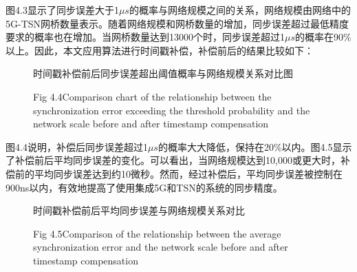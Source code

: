 \documentclass[UTF8,a4paper,12pt]{ctexart}
\numberwithin{equation}{section}
\begin{document}
	图4.3显示了同步误差大于1$\mu s$的概率与网络规模之间的关系，网络规模由网络中的5G-TSN网桥数量表示。随着网络规模和网桥数量的增加，同步误差超过最低精度要求的概率也在增加。当网桥数量达到13000个时，同步误差超过1$\mu s$的概率在90\%以上。因此，本文应用算法进行时间戳补偿，补偿前后的结果比较如下：
	\begin{figure}[htb] 
		\caption{时间戳补偿前后同步误差超出阈值概率与网络规模关系对比图}
		\vspace{-10pt}
		\caption*{Fig 4.4\quad Comparison chart of the relationship between the synchronization error exceeding the threshold probability and the network scale before and after timestamp compensation} 
	\end{figure}
	
	图4.4说明，补偿后同步误差超过1$\mu s$的概率大大降低，保持在20\%以内。图4.5显示了补偿前后平均同步误差的变化。可以看出，当网络规模达到10,000或更大时，补偿前的平均同步误差达到约10微秒。然而，经过补偿后，平均同步误差被控制在900ns以内，有效地提高了使用集成5G和TSN的系统的同步精度。
	\begin{figure}[H] 
		\caption{时间戳补偿前后平均同步误差与网络规模关系对比}
		\vspace{-10pt}
		\caption*{Fig 4.5\quad Comparison of the relationship between the average synchronization error and the network scale before and after timestamp compensation} 
	\end{figure}
	
\end{document}
